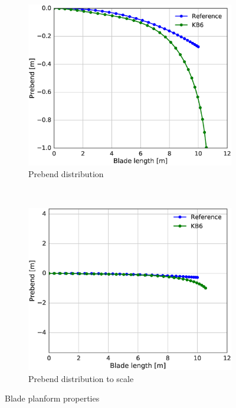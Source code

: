 \begin{figure}[tph]
\begin{subfigure}{0.50\textwidth}
\includegraphics[width=\linewidth]{figures/KB6_final/KB6_prebend.eps}
\caption{Prebend distribution}
\label{subfig:KB6_prebend}
\end{subfigure}
 ~
\begin{subfigure}{0.50\textwidth}
\includegraphics[width=\linewidth]{figures/KB6_final/KB6_prebend_scale.eps}
\caption{Prebend distribution to scale}
\label{subfig:KB6_prebend_scale}
\end{subfigure}

\caption{Blade planform properties}
\label{fig:KB6_sweep_prebend}
\end{figure}

